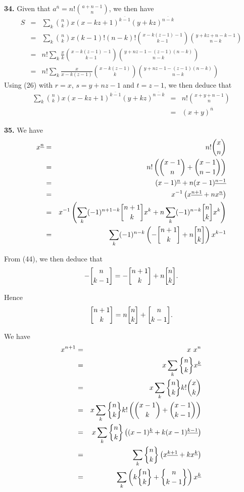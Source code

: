 \documentclass[a4paper,12pt]{article}
\newcommand{\newpar}[1]{\bigskip \noindent \textbf{#1.}}
\newcommand{\stirlingone}[2]{{#1 \atopwithdelims[]#2}}
\newcommand{\stirlingtwo}[2]{{#1 \atopwithdelims\{\}#2}}
\begin{document}
\newpar{34}  Given that $a^{\overline{n}} = n!{a+n-1 \choose n}$, we
then have
\begin{eqnarray*}
  S &=& \sum_k {n \choose k}
  x(x-kz+1)^{\overline{k-1}}(y+kz)^{\overline{n-k}} \\ &=& \sum_k {n
    \choose k} x (k-1)!(n-k)! {x-k(z-1)-1 \choose k-1} {y + kz + n - k
    - 1 \choose n-k} \\
  &=& n!\sum_k \frac{x}{k} {x -k (z-1)-1 \choose k-1}{y+nz - 1 -
    (z-1)(n-k) \choose n-k} \\
  &=& n! \sum_k \frac{x}{x - k(z-1)} {x - k(z-1) \choose k}{y+nz-1 -
    (z-1)(n-k) \choose n-k}
\end{eqnarray*}
Using (26) with $r=x$, $s = y+nz-1$ and $t = z-1$, we then deduce that
\begin{eqnarray*}
  \sum_k {n\choose k}x(x-kz+1)^{\overline{k-1}}(y+kz)^{\overline{n-k}}
  &=& n! {x + y + n - 1 \choose n} \\
  &=& (x+y)^{\overline{n}}
\end{eqnarray*}

\newpar{35} We have
\begin{eqnarray*}
  x^{\underline{n}} &=& n! {x \choose n} \\
  &=& n! \left( {x-1 \choose n} + {x-1 \choose n-1} \right) \\
  &=& (x-1)^{\underline{n}} + n (x-1)^{\underline{n-1}} \\
  &=& x^{-1} \left( x^{\underline{n+1}} + n x^{\underline{n}}\right)\\
  &=& x^{-1} \left( \sum_k (-1)^{n+1-k} \stirlingone{n+1}{k} x^k + n
  \sum_k (-1)^{n-k}\stirlingone{n}{k}x^k\right) \\
  &=& \sum_k (-1)^{n-k} \left( -\stirlingone{n+1}{k} + n
  \stirlingone{n}{k}\right) x^{k-1}
\end{eqnarray*}

From (44), we then deduce that
\[ - \stirlingone{n}{k-1} = - \stirlingone{n+1}{k} + n
\stirlingone{n}{k}.\]

Hence
\[ \stirlingone{n+1}{k} = n \stirlingone{n}{k} +
\stirlingone{n}{k-1}.\]

We have
\begin{eqnarray*}
  x^{n+1} &=& x\ x^n \\
  &=& x \sum_k \stirlingtwo{n}{k} x^{\underline{k}} \\
  &=& x \sum_k \stirlingtwo{n}{k} k! {x \choose k} \\
  &=& x \sum_k \stirlingtwo{n}{k} k! \left( {x-1 \choose k} + {x-1
    \choose k-1} \right) \\
  &=& x \sum_k \stirlingtwo{n}{k} \left( (x-1)^{\underline{k}} + k
  (x-1)^{\underline{k-1}} \right) \\
  &=& \sum_k \stirlingtwo{n}{k} \left( x^{\underline{k+1}} + k
  x^{\underline{k}} \right) \\
  &=& \sum_k \left(k \stirlingtwo{n}{k} + \stirlingtwo{n}{k-1}\right)
  x^{\underline{k}}
\end{eqnarray*}
\end{document}
